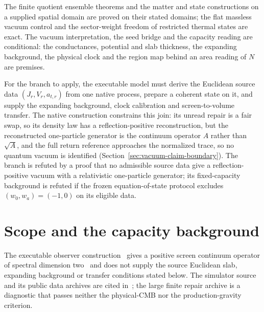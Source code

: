 \documentclass[11pt]{article}
\theoremstyle{remark}
\theoremstyle{plain}
\begin{document}
The finite quotient ensemble theorems and the matter and state constructions
on a supplied spatial domain are proved on their stated domains; the flat
massless vacuum control and the sector-weight freedom of restricted thermal
states are exact. The vacuum interpretation, the seed bridge and the
capacity reading are conditional: the conductances, potential and slab
thickness, the expanding background, the physical clock and the region map
behind an area reading of \(N\) are premises.

For the branch to apply, the executable model must derive the Euclidean
source data \((J_r,V_r,a_{t,r})\) from one native process, prepare a coherent
state on it, and supply the expanding background, clock calibration and
screen-to-volume transfer. The native construction constrains this join: its
unread repair is a fair swap, so its density law has a reflection-positive
reconstruction, but the reconstructed one-particle generator is the
continuum operator \(A\) rather than \(\sqrt A\), and the full return
reference approaches the normalized trace, so no quantum vacuum is
identified (Section~\ref{sec:vacuum-claim-boundary}). The branch is refuted
by a proof that no admissible source data give a reflection-positive vacuum
with a relativistic one-particle generator; its fixed-capacity background is
refuted if the frozen equation-of-state protocol excludes
\((w_0,w_a)=(-1,0)\) on its eligible data.

\section{Scope and the capacity background}

The executable observer construction~\cite{ophmodel,ophspine} gives a
positive screen continuum operator of spectral dimension
two~\cite{ophcontinuum} and does not supply the source Euclidean slab,
expanding background or transfer conditions stated below. The simulator source and its public data archives are cited in~\cite{ophsim};
the large finite repair archive is a diagnostic that passes neither the
physical-CMB nor the production-gravity criterion.
\end{document}
